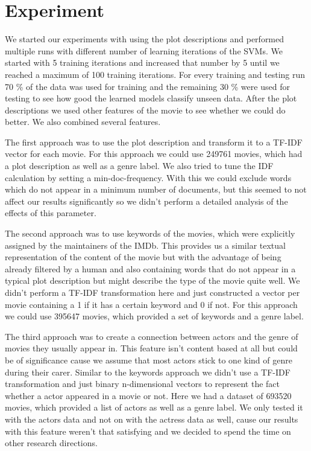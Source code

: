 \documentclass{vldb}
\begin{document}
\section{Experiment}


\par We started our experiments with using the plot descriptions and performed multiple runs with different number of learning iterations of the SVMs. We started with 5 training iterations and increased that number by 5 until we reached a maximum of 100 training iterations. For every training and testing run 70 \% of the data was used for training and the remaining 30 \% were used for testing to see how good the learned models classify unseen data. After the plot descriptions we used other features of the movie to see whether we could do better. We also combined several features.

\par The first approach was to use the plot description and transform it to a TF-IDF vector for each movie. For this approach we could use 249761 movies, which had a plot description as well as a genre label. We also tried to tune the IDF calculation by setting a min-doc-frequency. With this we could exclude words which do not appear in a minimum number of documents, but this seemed to not affect our results significantly so we didn't perform a detailed analysis of the effects of this parameter.

\par The second approach was to use keywords of the movies, which were explicitly assigned by the maintainers of the IMDb. This provides us a similar textual representation of the content of the movie but with the advantage of being already filtered by a human and also containing words that do not appear in a typical plot description but might describe the type of  the movie quite well. We didn't perform a TF-IDF transformation here and just constructed a vector per movie containing a 1 if it has a certain keyword and 0 if not. For this approach we could use 395647 movies, which provided a set of keywords and a genre label.

\par The third approach was to create a connection between actors and the genre of movies they usually appear in. This feature isn't content based at all but could be of significance cause we assume that most actors stick to one kind of genre during their carer. Similar to the keywords approach we didn't use a TF-IDF transformation and just binary n-dimensional vectors to represent the fact whether a actor appeared in a movie or not. Here we had a dataset of 693520 movies, which provided a list of actors as well as a genre label. We only tested it with the actors data and not on with the actress data as well, cause our results with this feature weren't that satisfying and we decided to spend the time on other research directions.
\end{document}
